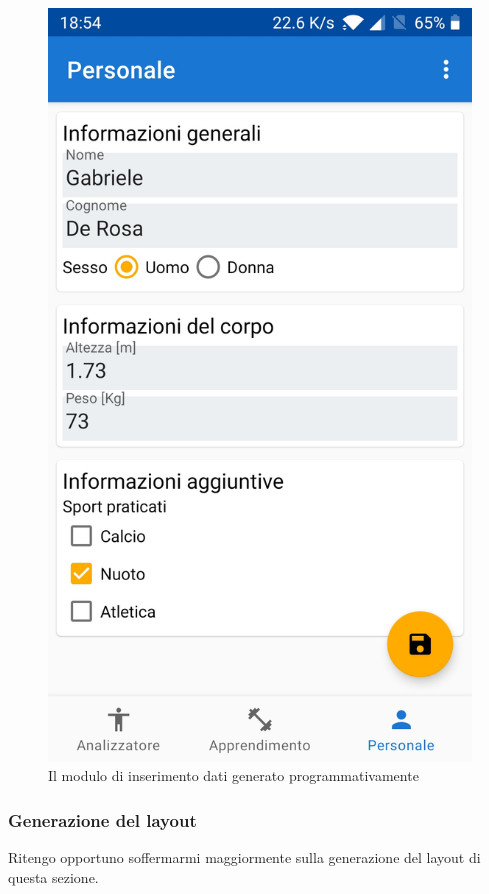\begin{figure}[H]
    \centering
    \includegraphics[scale = 0.1019]{assets/images/screenshots/3a_Init.jpg}    
    \caption{Il modulo di inserimento dati generato programmativamente}
    \label{fig:screenshots_personal}
\end{figure}

\subsubsection{Generazione del layout}
Ritengo opportuno soffermarmi maggiormente sulla generazione del layout di questa sezione.

